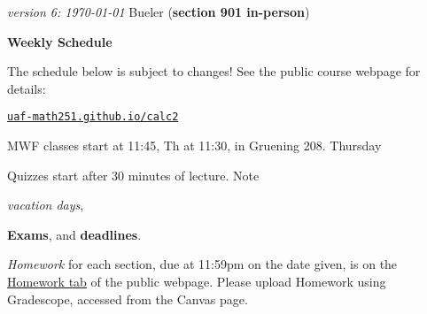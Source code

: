 \documentclass[12pt]{article}
\newcommand{\vacinline}[1]{{\color{OliveGreen} \textsl{#1}}}
\newcommand{\vac}[1]{\strut {\small {\vacinline{#1}}}}
\newcommand{\due}[1]{\strut {\color{BrickRed} \textsl{#1}}}
\newcommand{\dl}[1]{{\small \color{Purple} \textbf{#1}}}
\newcommand{\ee}[1]{\strut {\color{Blue} \textbf{#1}}}
\newcommand{\qq}[1]{\strut {\color{RedOrange} #1}}
\begin{document}
\noindent\footnotesize \emph{version 6: \today} \normalsize \hfill Bueler (\textbf{section 901 in-person})

\bigskip
\centerline{\Large \textbf{Weekly Schedule}}

\bigskip
The schedule below is subject to changes!  See the public course webpage for details:

\medskip

\centerline{\href{https://uaf-math251.github.io/calc2/}{\texttt{uaf-math251.github.io/calc2}}}

\noindent MWF classes start at 11:45, Th at 11:30, in Gruening 208.  Thursday \qq{Quizzes} start after 30 minutes of lecture.  Note \vac{vacation days}, \ee{Exams}, and \dl{deadlines}.  \due{Homework} for each section, due at 11:59pm on the date given, is on the \href{https://uaf-math251.github.io/calc2/}{Homework tab} of the public webpage.  Please upload Homework using Gradescope, accessed from the Canvas page.

\bigskip
\end{document}
